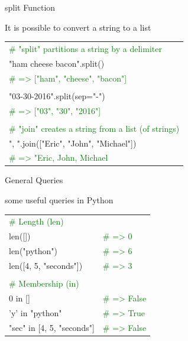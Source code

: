 \documentclass[serif, aspectratio=169]{beamer}
\newcommand{\tgreen}[1]{\textcolor{green}{#1}}
\newenvironment{CLI} %
    {
    \noindent
    \ttfamily 
    \footnotesize
    \begin{tcolorbox}[colback=gray!150,colframe=black]
    \color{white}
    \begin{tabular}{p{4.5cm}p{7.5cm}}
    }
    { 
    \end{tabular}
    \end{tcolorbox}
    }
\begin{document}
\begin{frame}{split Function}
    \begin{block}{It is possible to convert a string to a list}
        \vspace{2pt}
        \begin{CLI}
            \multicolumn{2}{l}{\tgreen{\# "split" partitions a string by a delimiter}} \\
            "ham cheese bacon".split() & \\
            \multicolumn{2}{l}{\tgreen{\# => ["ham", "cheese", "bacon"]}} \\
            \pause
            & \\
            "03-30-2016".split(sep="-") & \\
            \tgreen{\# => ["03", "30", "2016"]} & \\
            \pause
            & \\
            \multicolumn{2}{l}{\tgreen{\# "join" creates a string from a list (of strings)}} \\
            \multicolumn{2}{l}{", ".join(["Eric", "John", "Michael"])} \\
            \tgreen{\# => "Eric, John, Michael} & \\
        \end{CLI}
    \end{block}
\end{frame}

\begin{frame}{General Queries}
    \begin{block}{some useful queries in Python}
        \vspace{2pt}
        \begin{CLI}
            \tgreen{\# Length (len)} & \\
            len([]) & \tgreen{\# => 0} \\
            len("python") & \tgreen{\# => 6} \\
            len([4, 5, "seconds"]) & \tgreen{\# => 3} \\
            \pause
            & \\
            \tgreen{\# Membership (in)} & \\
            0 in [] & \tgreen{\# => False} \\
            'y' in "python" & \tgreen{\# => True} \\
            "sec" in [4, 5, "seconds"] & \tgreen{\# => False} \\
        \end{CLI}        
    \end{block}
\end{frame}
\end{document}
